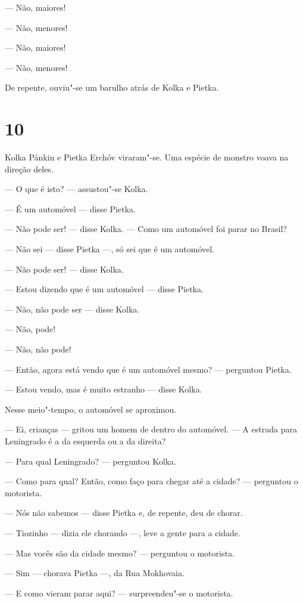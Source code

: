 --- Não, maiores!

--- Não, menores!

--- Não, maiores!

--- Não, menores!

De repente, ouviu"-se um barulho atrás de Kolka e Pietka.

\section{10}

Kolka Pánkin e Pietka Erchóv viraram"-se. Uma espécie de monstro voava na
direção deles.

--- O que é isto? --- assustou"-se Kolka.

--- É um automóvel --- disse Pietka.

--- Não pode ser! --- disse Kolka. --- Como um automóvel foi parar no
Brasil?

--- Não sei --- disse Pietka ---, só sei que é um automóvel.

--- Não pode ser! --- disse Kolka.

--- Estou dizendo que é um automóvel --- disse Pietka.

--- Não, não pode ser --- disse Kolka.

--- Não, pode!

--- Não, não pode!

--- Então, agora está vendo que é um automóvel mesmo? --- perguntou
Pietka.

--- Estou vendo, mas é muito estranho --- disse Kolka.

Nesse meio"-tempo, o automóvel se aproximou.

--- Ei, crianças --- gritou um homem de dentro do automóvel. --- A
estrada para Leningrado é a da esquerda ou a da direita?

--- Para qual Leningrado? --- perguntou Kolka.

--- Como para qual? Então, como faço para chegar até a cidade? ---
perguntou o motorista.

--- Nós não sabemos --- disse Pietka e, de repente, deu de chorar.

--- Tiozinho --- dizia ele chorando ---, leve a gente para a cidade.

--- Mas vocês são da cidade mesmo? --- perguntou o motorista.

--- Sim --- chorava Pietka ---, da Rua Mokhovaia.

--- E como vieram parar aqui? --- surpreendeu"-se o motorista.

